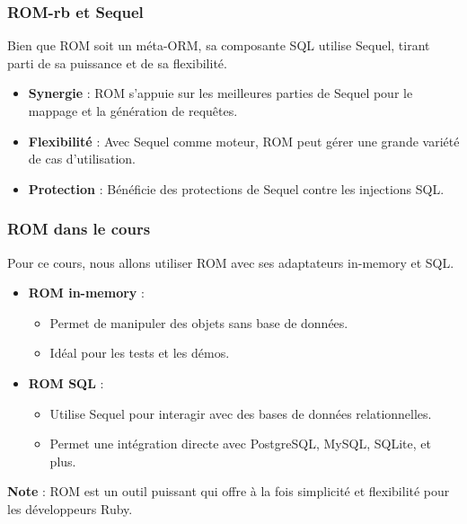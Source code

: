 \begin{frame}
  \frametitle{ROM-rb et Sequel}

  Bien que ROM soit un méta-ORM, sa composante SQL utilise Sequel, tirant parti de sa puissance et de sa flexibilité.

  \begin{itemize}
    \item \textbf{Synergie} : ROM s'appuie sur les meilleures parties de Sequel pour le mappage et la génération de requêtes.
    \item \textbf{Flexibilité} : Avec Sequel comme moteur, ROM peut gérer une grande variété de cas d'utilisation.
    \item \textbf{Protection} : Bénéficie des protections de Sequel contre les injections SQL.
  \end{itemize}

\end{frame}

\begin{frame}
  \frametitle{ROM dans le cours}

  Pour ce cours, nous allons utiliser ROM avec ses adaptateurs in-memory et SQL.

  \begin{itemize}
    \item \textbf{ROM in-memory} :
      \begin{itemize}
        \item Permet de manipuler des objets sans base de données.
        \item Idéal pour les tests et les démos.
      \end{itemize}
    \item \textbf{ROM SQL} :
      \begin{itemize}
        \item Utilise Sequel pour interagir avec des bases de données relationnelles.
        \item Permet une intégration directe avec PostgreSQL, MySQL, SQLite, et plus.
      \end{itemize}
  \end{itemize}

  \textbf{Note} : ROM est un outil puissant qui offre à la fois simplicité et flexibilité pour les développeurs Ruby.

\end{frame}

